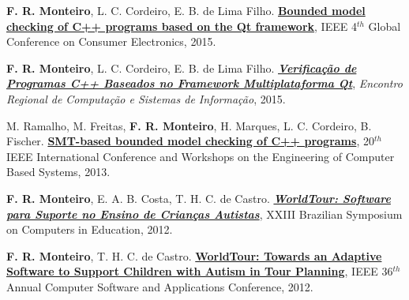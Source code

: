 \documentclass[letterpaper]{article}
\renewenvironment{itemize}{
  \begin{list}{}{
    \setlength{\leftmargin}{1.5em}
  }
}{
  \end{list}
}
\begin{document}
\begin{itemize}
    \item {\bf F. R. Monteiro}, L. C. Cordeiro, E. B. de Lima Filho. \href{http://ieeexplore.ieee.org/abstract/document/7398699/}{{\bf Bounded model checking of C++ programs based on the Qt framework}},
  IEEE 4$^{th}$ Global Conference on Consumer Electronics, 2015.

    \item {\bf F. R. Monteiro}, L. C. Cordeiro, E. B. de Lima Filho. \href{http://ufam-automation.net/lucascordeiro/images/papers/encosis2015-sousa.pdf}{{\bf {\it Verificação de Programas C++ Baseados no Framework Multiplataforma Qt}}},
  {\it Encontro Regional de Computação e Sistemas de Informação}, 2015.
    
  \item M. Ramalho, M. Freitas, {\bf F. R. Monteiro}, H. Marques, L. C. Cordeiro, B. Fischer. \href{http://ieeexplore.ieee.org/abstract/document/6601583/}{{\bf SMT-based bounded model checking of C++ programs}},
  20$^{th}$ IEEE International Conference and Workshops on the Engineering of Computer Based Systems, 2013.

    \item {\bf F. R. Monteiro}, E. A. B. Costa, T. H. C. de Castro. \href{http://www.br-ie.org/pub/index.php/sbie/article/view/1806}{{\bf {\it WorldTour: Software para Suporte no Ensino de Crianças Autistas}}},
  XXIII Brazilian Symposium on Computers in Education, 2012.
    
    \item {\bf F. R. Monteiro}, T. H. C. de Castro. \href{http://ieeexplore.ieee.org/abstract/document/6340181/}{{\bf WorldTour: Towards an Adaptive Software to Support Children with Autism in Tour Planning}},
  IEEE 36$^{th}$ Annual Computer Software and Applications Conference, 2012.

\end{itemize}
\end{document}
